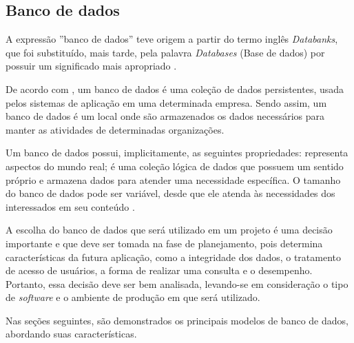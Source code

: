 \subsection{Banco de dados}

\par A expressão ''banco de dados'' teve origem a partir do termo inglês \textit{Databanks}, que foi substituído, mais tarde, pela palavra \textit{Databases} (Base de dados)  por possuir um significado mais apropriado \cite {setzer_silva_banco_dados_aprenda_o_que_sao_melhore_conhecimento}.

\par De acordo com , um banco de dados é uma coleção de dados persistentes, usada pelos sistemas de aplicação em uma determinada empresa. Sendo assim, um banco de dados é um local onde são armazenados os dados necessários para manter as atividades de determinadas organizações.

\par Um banco de dados possui, implicitamente, as seguintes propriedades: representa aspectos do mundo real; é uma coleção lógica de dados que possuem um sentido próprio e armazena dados para atender uma necessidade específica. O tamanho do banco de dados pode ser variável, desde que ele atenda às necessidades dos interessados em seu conteúdo \cite{elmasri_navathe_sistemas_banco_dados}.

\par A escolha do banco de dados que será utilizado em um projeto é uma decisão importante e que deve ser tomada na fase de planejamento, pois determina características da futura aplicação, como a integridade dos dados, o tratamento de acesso de usuários, a forma de realizar uma consulta e o desempenho. Portanto, essa decisão deve ser bem analisada, levando-se em consideração o tipo de \textit{software} e o ambiente de produção em que será utilizado.

\par Nas seções seguintes, são demonstrados os principais modelos de banco de dados, abordando suas características.